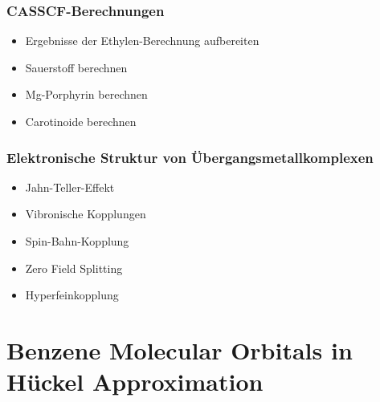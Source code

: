 \documentclass[9pt]{report}
\begin{document}
\subsubsection{CASSCF-Berechnungen}
\begin{itemize}
	\item Ergebnisse der Ethylen-Berechnung aufbereiten
	\item Sauerstoff berechnen
	\item Mg-Porphyrin berechnen
	\item Carotinoide berechnen
\end{itemize}




\subsubsection{Elektronische Struktur von Übergangsmetallkomplexen}
\begin{itemize}
	\item Jahn-Teller-Effekt
	\item Vibronische Kopplungen
	\item Spin-Bahn-Kopplung
	\item Zero Field Splitting
	\item Hyperfeinkopplung
\end{itemize}









\section{Benzene Molecular Orbitals in Hückel Approximation}
\end{document}
